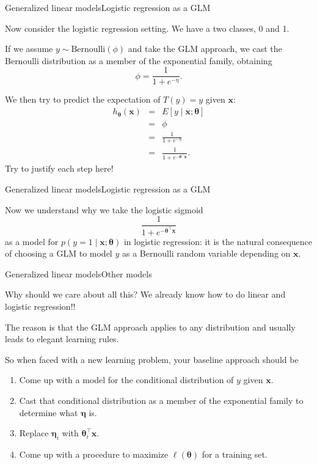 \documentclass{beamer}
\renewcommand{\vec}[1]{\boldsymbol{#1}}
\begin{document}
\begin{frame}{Generalized linear models}{Logistic regression as a GLM}

  Now consider the logistic regression setting. We have a two classes,
  0 and 1.

  \medskip

  If we assume $y \sim \textrm{Bernoulli}(\phi)$ and take the GLM
  approach, we cast the Bernoulli distribution as a member of the
  exponential family, obtaining
  \[ \phi = \frac{1}{1+e^{-\eta}}. \]

  We then try to predict the expectation of $T(y) = y$ given
  $\vec{x}$:
  \begin{eqnarray}
    h_{\vec{\theta}}(\vec{x}) & = & E[y \mid \vec{x} ; \vec{\theta}] \nonumber \\
    & = & \phi \nonumber \\
    & = & \frac{1}{1+e^{-\eta}} \nonumber \\
    & = & \frac{1}{1+e^{-\vec{\theta}^\top \vec{x}}} .\nonumber
  \end{eqnarray}
  Try to justify each step here!
   
\end{frame}


\begin{frame}{Generalized linear models}{Logistic regression as a GLM}

  Now we understand why we take the logistic sigmoid
  \[ \frac{1}{1+e^{-\vec{\theta}^\top\vec{x}}} \]
  as a model for $p(y=1 \mid \vec{x} ; \vec{\theta})$ in logistic
  regression: it is the natural consequence of \alert{choosing a GLM to model
  $y$ as a Bernoulli random variable depending on $\vec{x}$}.
  
\end{frame}


\begin{frame}{Generalized linear models}{Other models}

  Why should we care about all this? We already know how to do linear
  and logistic regression!!

  \medskip

  The reason is that the GLM approach applies to \alert{any
    distribution} and usually leads to \alert{elegant learning rules}.

  \medskip

  So when faced with a new learning problem, your baseline approach should be
  \begin{enumerate}
  \item Come up with a model for the conditional distribution of $y$
    given $\vec{x}$.
  \item Cast that conditional distribution as a member of the exponential family to determine what $\vec{\eta}$ is.
  \item Replace $\vec{\eta}_i$ with $\vec{\theta}_i^\top \vec{x}$.
  \item Come up with a procedure to maximize $\ell(\vec{\theta})$ for
    a training set.
  \end{enumerate}
    
\end{frame}
\end{document}
